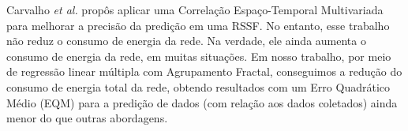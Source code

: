 \documentclass{acm_proc_article-sp}
\begin{document}
Carvalho \textit{et al.} \cite{Carvalho2011} propôs aplicar uma Correlação
Espaço-Temporal Multivariada para melhorar a precisão da predição em uma RSSF.
No entanto, esse trabalho não reduz o consumo de energia da rede. Na verdade,
ele ainda aumenta o consumo de energia da rede, em muitas situações. Em nosso
trabalho, por meio de regressão linear múltipla com Agrupamento Fractal,
conseguimos a redução do consumo de energia total da rede, obtendo resultados
com um Erro Quadrático Médio (EQM) para a predição de dados (com relação aos
dados coletados) ainda menor do que outras abordagens.
\vspace*{-.3cm}
\end{document}
